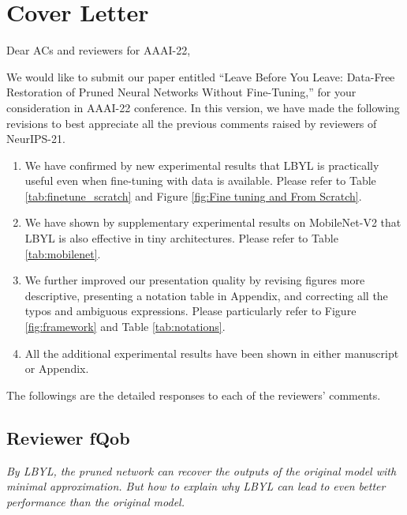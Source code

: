 \onecolumn


\section*{Cover Letter}

\vspace{10mm}

\setcounter{table}{0}
\setcounter{figure}{0}

\renewcommand{\thetable}{C\arabic{table}}  
\renewcommand{\thefigure}{C\arabic{figure}}
\renewcommand{\thesubsection}{C\arabic{subsection}}
		
Dear ACs and reviewers for AAAI-22,

We would like to submit our paper entitled ``Leave Before You Leave: Data-Free Restoration of Pruned Neural Networks Without Fine-Tuning,'' for your consideration in AAAI-22 conference. In this version, we have made the following revisions to best appreciate all the previous comments raised by reviewers of NeurIPS-21.

\begin{enumerate}
    \item We have confirmed by new experimental results that LBYL is practically useful even when fine-tuning with data is available. Please refer to Table \ref{tab:finetune_scratch} and Figure \ref{fig:Fine tuning and From Scratch}.
    \item We have shown by supplementary experimental results on MobileNet-V2 that LBYL is also effective in tiny architectures. Please refer to Table \ref{tab:mobilenet}.
    \item We further improved our presentation quality by revising figures more descriptive, presenting a notation table in Appendix, and correcting all the typos and ambiguous expressions. Please particularly refer to Figure \ref{fig:framework} and Table \ref{tab:notations}.
    \item All the additional experimental results have been shown in either manuscript or Appendix.
\end{enumerate}


The followings are the detailed responses to each of the reviewers' comments.

\subsection*{Reviewer fQob}

\textit{By LBYL, the pruned network can recover the outputs of the original model with minimal approximation. But how to explain why LBYL can lead to even better performance than the original model.}

